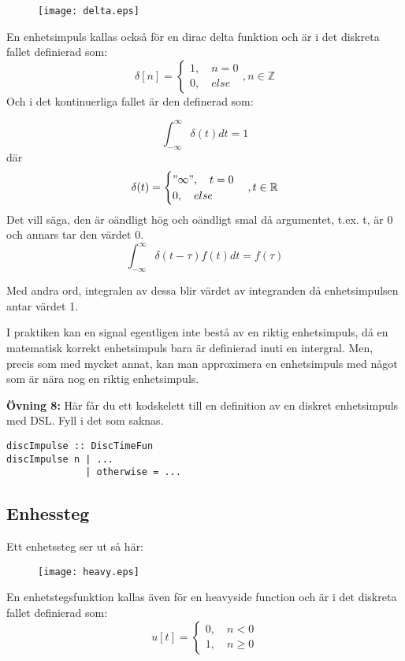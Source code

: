 \documentclass{article}
\begin{document}
\begin{figure}[ht]
\centerline{\texttt{[image: delta.eps]}} 

\caption{}
\label{}
\end{figure}

En enhetsimpuls kallas också för en dirac delta funktion och är i det diskreta fallet definierad som: 
$$
\delta[n]=
\begin{cases}
    1,\quad n = 0 \\
    0, \quad else
\end{cases}, n \in \mathbb{Z}
$$
Och i det kontinuerliga fallet är den definerad som:

$$\int_{-\infty}^{\infty} \delta(t) dt = 1 $$
där
$$
\delta(t)=
\begin{cases}
"\infty",\quad t = 0 \\
0, \quad else
\end{cases}, t\in \mathbb{R}
$$
Det vill säga, den är oändligt hög och oändligt smal då argumentet, t.ex. t, är 0 och annars tar den värdet 0.
$$\int_{-\infty}^{\infty} \delta(t-\tau) f(t) dt = f(\tau) $$

Med andra ord, integralen av dessa blir värdet av integranden då enhetsimpulsen antar värdet 1.

I praktiken kan en signal egentligen inte bestå av en riktig enhetsimpuls, då en matematisk korrekt enhetsimpuls bara är definierad inuti en intergral. Men, precis som med mycket annat, kan man approximera en enhetsimpuls med något som är nära nog en riktig enhetsimpuls.

\textbf{Övning 8:} Här får du ett kodskelett till en definition av en diskret enhetsimpuls med DSL. Fyll i det som saknas.\\
\begin{verbatim}
discImpulse :: DiscTimeFun
discImpulse n | ...
              | otherwise = ...
\end{verbatim}

\subsection{Enhessteg}
Ett enhetssteg ser ut så här:

\begin{figure}[h]
\centerline{\texttt{[image: heavy.eps]}}
\caption{}
\label{}
\end{figure}

En enhetstegsfunktion kallas även för en heavyside function och är i det diskreta fallet definierad som:
$$
u[t] =
\begin{cases}
0, \quad n < 0 \\
1, \quad n \geq 0
\end{cases}
$$
\end{document}
